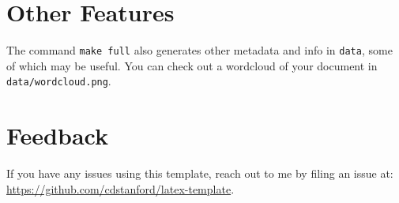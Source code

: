 \documentclass{article}
\begin{document}
\section{Other Features}

The command \texttt{make full} also generates other metadata and info in \texttt{data}, some of which may be useful. You can check out a wordcloud of your document in \texttt{data/wordcloud.png}.

\section{Feedback}

If you have any issues using this template, reach out to me by filing an issue at:
\url{https://github.com/cdstanford/latex-template}.



\end{document}
